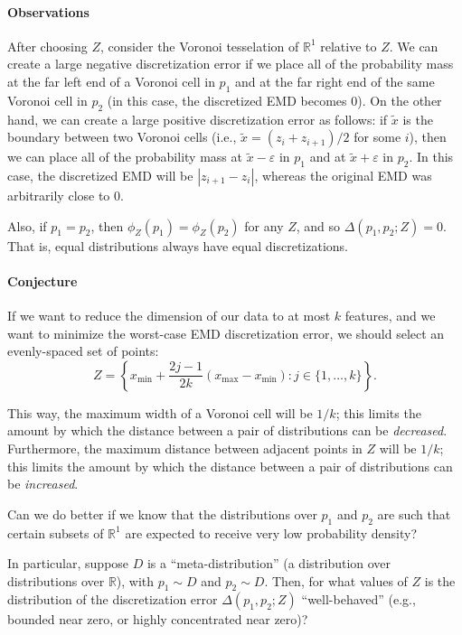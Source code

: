 \documentclass[11pt]{article}
\newcommand{\eps}{\varepsilon}
\newcommand{\abs}[1]{\left\lvert#1\right\rvert}
\newcommand{\xmin}{x_\mathrm{min}}
\newcommand{\xmax}{x_\mathrm{max}}
\theoremstyle{definition}
\begin{document}
\paragraph{Observations} After choosing $Z$, consider the Voronoi tesselation of $\mathbb R^1$ relative to $Z$.  We can create a large negative discretization error if we place all of the probability mass at the far left end of a Voronoi cell in $p_1$ and at the far right end of the same Voronoi cell in $p_2$ (in this case, the discretized EMD becomes 0).  On the other hand, we can create a large positive discretization error as follows: if $\tilde x$ is the boundary between two Voronoi cells (i.e., $\tilde x = (z_i + z_{i+1})/2$ for some $i$), then we can place all of the probability mass at $\tilde x - \eps$ in $p_1$ and at $\tilde x + \eps$ in $p_2$.  In this case, the discretized EMD will be $\abs{z_{i+1}-z_i}$, whereas the original EMD was arbitrarily close to $0$.

Also, if $p_1 = p_2$, then $\phi_Z(p_1) = \phi_Z(p_2)$ for any $Z$, and so $\Delta(p_1, p_2; Z) = 0$.  That is, equal distributions always have equal discretizations.

\paragraph{Conjecture} If we want to reduce the dimension of our data to at most $k$ features, and we want to minimize the worst-case EMD discretization error, we should select an evenly-spaced set of points:
\[ Z = \left\{ \xmin + \frac{2j-1}{2k}(\xmax-\xmin) : j \in \{ 1, \ldots, k \} \right\}. \]

This way, the maximum width of a Voronoi cell will be $1/k$; this limits the amount by which the distance between a pair of distributions can be \emph{decreased}.  Furthermore, the maximum distance between adjacent points in $Z$ will be $1/k$; this limits the amount by which the distance between a pair of distributions can be \emph{increased}.

Can we do better if we know that the distributions over $p_1$ and $p_2$ are such that certain subsets of $\mathbb R^1$ are expected to receive very low probability density?

In particular, suppose $D$ is a ``meta-distribution'' (a distribution over distributions over $\mathbb R$), with $p_1 \sim D$ and $p_2 \sim D$.  Then, for what values of $Z$ is the distribution of the discretization error $\Delta(p_1, p_2; Z)$ ``well-behaved'' (e.g., bounded near zero, or highly concentrated near zero)?
\end{document}
